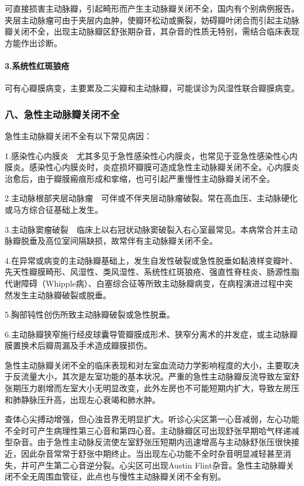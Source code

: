 可直接损害主动脉瓣，引起畸形而产生主动脉瓣关闭不全，国内有个别病例报告。夹层主动脉瘤可由于夹层内血肿，使瓣环松动或撕裂，妨碍瓣叶闭合而引起主动脉瓣关闭不全，出现主动脉瓣区舒张期杂音，其杂音的性质无特别，需结合临床表现方能作出诊断。

\paragraph{3.系统性红斑狼疮}

可有心瓣膜病变，主要累及二尖瓣和主动脉瓣，可能误诊为风湿性联合瓣膜病变。

\subsubsection{八、急性主动脉瓣关闭不全}

急性主动脉瓣关闭不全有以下常见病因：

1.感染性心内膜炎　尤其多见于急性感染性心内膜炎，也常见于亚急性感染性心内膜炎。感染性心内膜炎时，炎症损坏瓣膜可造成急性主动脉瓣关闭不全。心内膜炎治愈后，由于瓣膜瘢痕形成和挛缩，也可引起严重慢性主动脉瓣关闭不全。

2.主动脉根部夹层动脉瘤　可伴或不伴夹层动脉瘤破裂。常在高血压、主动脉硬化或马方综合征基础上发生。

3.主动脉窦瘤破裂　临床上以右冠状动脉窦破裂入右心室最常见。本病常合并主动脉瓣脱垂及高位室间隔缺损，故常伴有主动脉瓣关闭不全。

4.在异常或病变的主动脉瓣基础上，发生自发性破裂或急性脱垂如黏液样变瓣叶、先天性瓣膜畸形、风湿性、类风湿性、系统性红斑狼疮、强直性脊柱炎、肠源性脂代谢障碍（Whipple病）、白塞综合征等所致主动脉瓣病变，在病程演进过程中突然发生主动脉瓣破裂或脱垂。

5.胸部钝性创伤所致主动脉瓣破裂或急性脱垂。

6.主动脉瓣狭窄施行经皮球囊导管瓣膜成形术、狭窄分离术的并发症，或主动脉瓣膜置换术后瓣周漏及手术造成瓣膜损伤。

急性主动脉瓣关闭不全的临床表现和对左室血流动力学影响程度的大小，主要取决于反流量大小，其次是左室功能的基本状况。严重的急性主动脉瓣反流导致左室舒张期压力剧增而左室大小无明显改变，此外左房也不可能短期内扩大，导致左房压和肺静脉压升高，出现左心衰竭和肺水肿。

查体心尖搏动增强，但心浊音界无明显扩大。听诊心尖区第一心音减弱，左心功能不全时可产生病理性第三心音和第四心音。主动脉瓣区可出现舒张早期哈气样递减型杂音。由于急性主动脉反流使左室舒张压短期内迅速增高与主动脉舒张压很快接近，因此杂音常常于舒张中期终止。当出现左心功能不全时杂音明显减轻甚至消失，并可产生第二心音逆分裂。心尖区可出现Austin
Flint杂音。急性主动脉瓣关闭不全无周围血管征，此点也与慢性主动脉瓣关闭不全有别。

